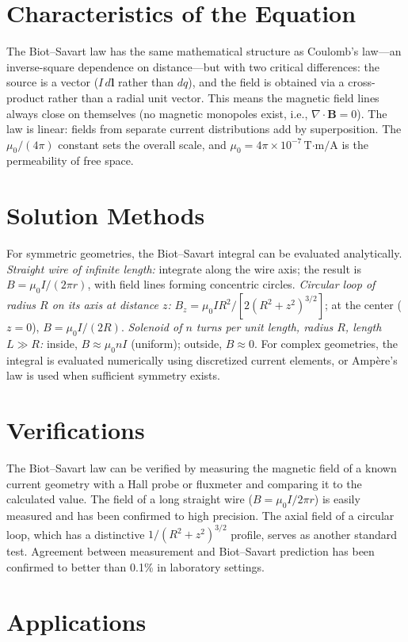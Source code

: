 \section*{Characteristics of the Equation}

The Biot--Savart law has the same mathematical structure as Coulomb's law---an inverse-square dependence on distance---but with two critical differences: the source is a vector ($I\,d\mathbf{l}$ rather than $dq$), and the field is obtained via a cross-product rather than a radial unit vector. This means the magnetic field lines always close on themselves (no magnetic monopoles exist, i.e., $\nabla\cdot\mathbf{B} = 0$). The law is linear: fields from separate current distributions add by superposition. The $\mu_0/(4\pi)$ constant sets the overall scale, and $\mu_0 = 4\pi\times 10^{-7}\,\text{T·m/A}$ is the permeability of free space.
\section*{Solution Methods}

For symmetric geometries, the Biot--Savart integral can be evaluated analytically. \textit{Straight wire of infinite length:} integrate along the wire axis; the result is $B = \mu_0 I / (2\pi r)$, with field lines forming concentric circles. \textit{Circular loop of radius $R$ on its axis at distance $z$:} $B_z = \mu_0 I R^2 / [2(R^2 + z^2)^{3/2}]$; at the center ($z=0$), $B = \mu_0 I/(2R)$. \textit{Solenoid of $n$ turns per unit length, radius $R$, length $L\gg R$:} inside, $B \approx \mu_0 n I$ (uniform); outside, $B\approx 0$. For complex geometries, the integral is evaluated numerically using discretized current elements, or Ampère's law is used when sufficient symmetry exists.
\section*{Verifications}

The Biot--Savart law can be verified by measuring the magnetic field of a known current geometry with a Hall probe or fluxmeter and comparing it to the calculated value. The field of a long straight wire ($B = \mu_0 I / 2\pi r$) is easily measured and has been confirmed to high precision. The axial field of a circular loop, which has a distinctive $1/(R^2+z^2)^{3/2}$ profile, serves as another standard test. Agreement between measurement and Biot--Savart prediction has been confirmed to better than 0.1\% in laboratory settings.
\section*{Applications}

